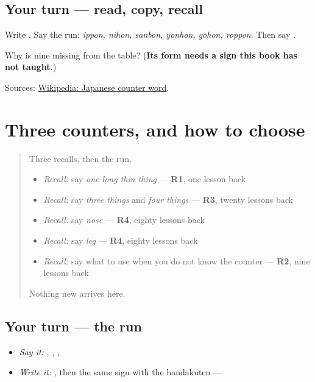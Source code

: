 \subsection*{Your turn — read, copy, recall}
Write \textbf{}. Say the run: \emph{ippon, nihon, sanbon, yonhon, gohon, roppon}. Then say \textbf{ }.

\begin{tcolorbox}[breakable,colback=teal!4,colframe=teal!35!black,title={Before you move on}]
Why is nine missing from the table? (\textbf{Its form needs a sign this book has not taught.})

Sources: \href{https://en.wikipedia.org/wiki/Japanese\_counter\_word}{Wikipedia: Japanese counter word}.
\end{tcolorbox}
\section[Practice]{Three counters, and how to choose}

\label{lesson:JA-R18-counting-things}



\begin{quote}
Three recalls, then the run.

\begin{itemize}
\raggedright
  \item \emph{Recall:} say \emph{one long thin thing} — \textbf{R1}, one lesson back
  \item \emph{Recall:} say \emph{three things} and \emph{four things} — \textbf{R3}, twenty lessons back
  \item \emph{Recall:} say \emph{nose} — \textbf{R4}, eighty lessons back
  \item \emph{Recall:} say \emph{leg} — \textbf{R4}, eighty lessons back
  \item \emph{Recall:} say what to use when you do not know the counter — \textbf{R2}, nine lessons back
\end{itemize}

Nothing new arrives here.
\end{quote}

\subsection*{Your turn — the run}
\begin{itemize}
\raggedright
  \item \emph{Say it:} \textbf{ }, \textbf{ }, \textbf{}, \textbf{ }
  \item \emph{Write it:} \textbf{}, then the same sign with the handakuten — \textbf{}
\end{itemize}

